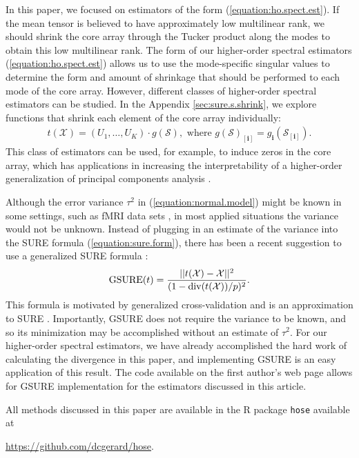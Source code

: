 In this paper, we focused on estimators of the form
(\ref{equation:ho.spect.est}). If the mean tensor is believed to have
approximately low multilinear rank, we should shrink the core array
through the Tucker product along the modes to obtain this low
multilinear rank. The form of our higher-order spectral estimators
(\ref{equation:ho.spect.est}) allows us to use the mode-specific
singular values to determine the form and amount of shrinkage that
should be performed to each mode of the core array. However, different
classes of higher-order spectral estimators can be studied. In the
Appendix \ref{sec:sure.s.shrink}, we explore functions that shrink
each element of the core array individually:
\begin{align*}
t(\mathcal{X}) = (U_1,\ldots,U_K)\cdot g(\mathcal{S}), \text{ where } g(\mathcal{S})_{[\mathbf{i}]} = g_{\mathbf{i}}(\mathcal{S}_{[\mathbf{i}]}).
\end{align*}
This class of estimators can be used, for example, to induce zeros in
the core array, which has applications in increasing the
interpretability of a higher-order generalization of principal
components analysis
\citep{henrion1993body,kiers1997uniqueness,murakami1998case,andersson1999general,de2001independent,martin2008jacobi}.

Although the error variance $\tau^2$ in (\ref{equation:normal.model})
might be known in some settings, such as fMRI data sets
\citep{candes2013unbiased}, in most applied situations the variance
would not be unknown. Instead of plugging in an estimate of the
variance into the SURE formula (\ref{equation:sure.form}), there has
been a recent suggestion to use a generalized SURE formula
\citep{sylvain2012smooth,josse2015adaptive}:
\begin{align*}
\operatorname*{GSURE}(t) = \frac{||t(\mathcal{X}) - \mathcal{X}||^2}{(1 - \operatorname*{div}(t(\mathcal{X}))/p)^2}.
\end{align*}
This formula is motivated by generalized cross-validation
\citep{golub1979generalized} and is an approximation to SURE
\citep{josse2015adaptive}. Importantly, GSURE does not require the
variance to be known, and so its minimization may be accomplished
without an estimate of $\tau^2$. For our higher-order spectral
estimators, we have already accomplished the hard work of calculating
the divergence in this paper, and implementing GSURE is an easy
application of this result. The code available on the first author's
web page allows for GSURE implementation for the estimators discussed
in this article.


All methods discussed in this paper are available in the R package
\texttt{hose} available at
\begin{center}
  \href{https://github.com/dcgerard/hose}{https://github.com/dcgerard/hose}.
\end{center}
